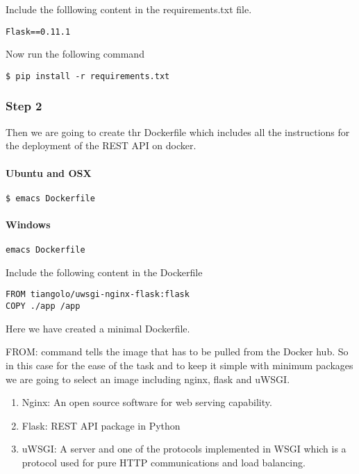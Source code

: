 Include the folllowing content in the requirements.txt file.

\begin{lstlisting}
Flask==0.11.1
\end{lstlisting}

Now run the following command

\begin{lstlisting}
$ pip install -r requirements.txt
\end{lstlisting}

\subsubsection{Step 2}

Then we are going to create thr Dockerfile which includes all the
instructions for the deployment of the REST API on docker.

\paragraph{Ubuntu and OSX}

\begin{lstlisting}
$ emacs Dockerfile
\end{lstlisting}

\paragraph{Windows}

\begin{lstlisting}
emacs Dockerfile
\end{lstlisting}

Include the following content in the Dockerfile

\begin{lstlisting}
FROM tiangolo/uwsgi-nginx-flask:flask
COPY ./app /app
\end{lstlisting}

Here we have created a minimal Dockerfile.

FROM: command tells the image that has to be pulled from the Docker hub.
So in this case for the ease of the task and to keep it simple with
minimum packages we are going to select an image including nginx, flask
and uWSGI.

\begin{enumerate}
\def\labelenumi{\arabic{enumi}.}
\item
  Nginx: An open source software for web serving capability.
\item
  Flask: REST API package in Python
\item
  uWSGI: A server and one of the protocols implemented in WSGI which is
  a protocol used for pure HTTP communications and load balancing.
\end{enumerate}


